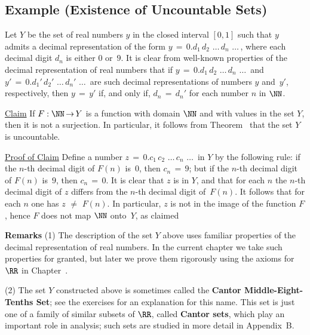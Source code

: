 \V

            \subsection{\small{\bf Example} (Existence of Uncountable Sets)}
            \label{ExampA20.85}

        Let $Y$ be the set of real numbers $y$ in the closed interval $[0,1]$ such that $y$ admits a decimal representation
    of the form $y \,=\, 0.d_{1}\,d_{2}\,\,{\ldots}\,d_{n}\,\,{\ldots}\,$, where each decimal digit $d_{n}$ is either $0$ or~$9$.
    It is clear from well-known properties of the decimal representation of real numbers that if $y \,=\, 0.d_{1}\,d_{2}\,\,{\ldots}\,d_{n}\,\,{\ldots}\,$
    and $y' \,=\, 0.d_{1}'\,d_{2}'\,\,{\ldots}\,d_{n}'\,\,{\ldots}\,$ are such decimal representations of numbers $y$ and~$y'$,
    respectively, then $y \,=\, y'$ if, and only if, $d_{n} \,=\, d_{n}'$ for each number $n$ in ${\NN}$.

\V

        \underline{Claim} If $F:{\NN} \,{\rightarrow}\, Y$ is a function with domain ${\NN}$ and with values in the set $Y$, then it is not a surjection.
    In particular, it follows from Theorem~ that the set $Y$ is uncountable.

\V

        \underline{Proof of Claim} Define a number $z \,=\, 0.c_{1}\,c_{2}\,\,{\ldots}\,c_{n}\,\,{\ldots}\,$ in $Y$ by the following rule:
    if the $n$-th decimal digit of $F(n)$ is~$0$, then $c_{n} \,=\, 9$; but if the $n$-th decimal digit of $F(n)$ is~$9$, then $c_{n} \,=\, 0$.
    It is clear that $z$ is in $Y$, and that for each $n$ the $n$-th decimal digit of $z$ differs from the $n$-th decimal digit of~$F(n)$.
    It follows that for each $n$ one has $z \,\,{\neq}\,\, F(n)$. In particular, $z$ is not in the image of the function $F$,
    hence $F$ does not map ${\NN}$ onto~$Y$, as claimed

\VV

        {\bf Remarks} (1) The description of the set $Y$ above uses familiar properties of the decimal representation of real numbers.
    In the current chapter we take such properties for granted, but later we prove them rigorously using the axioms for ${\RR}$ in Chapter~.

\V

        (2) The set $Y$ constructed above is sometimes called the {\bf Cantor Middle-Eight-Tenths Set};
     see the exercises for an explanation for this name.
    This set is just one of a family of similar subsets of ${\RR}$, called {\bf Cantor sets},
    which play an important role in analysis; such sets are studied in more detail in Appendix~B.


